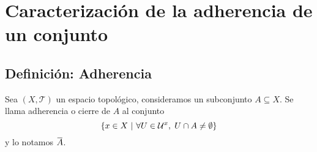 \documentclass{article}
\newcommand{\closure}[1]{\mkern
  1.5mu\overline{\mkern-1.5mu#1\mkern-1.5mu}\mkern 1.5mu}
\begin{document}
\section*{Caracterización de la adherencia de un conjunto}

\subsection*{Definición: Adherencia}

\begin{justify} Sea $(X, \mathcal{T})$ un espacio topológico,
  consideramos un subconjunto $A \subseteq X$. Se llama adherencia o
  cierre de $A$ al conjunto
  \[\{x \in X \text{ }|\text{ } \forall U \in
    \mathcal{U}^x,\hspace{1mm} U \cap A \neq \emptyset\}\]
  y lo notamos $\closure{A}$.
\end{justify}
\end{document}
